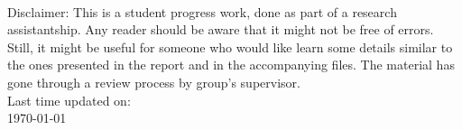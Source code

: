 \begin{titlepage}
\begin{center}
~\\[1cm]


\vfill

{Disclaimer: This is a student progress work, done as part of a research assistantship. Any reader should be aware that it might not be free of errors. Still, it might be useful for someone who would like learn some details similar to the ones presented in the report and in the accompanying files. The material has gone through a review process by group's supervisor.}\\[2cm]

{Last time updated on:}\\
\vspace{0.1cm}
{\large \today}

\end{center}

\end{titlepage}